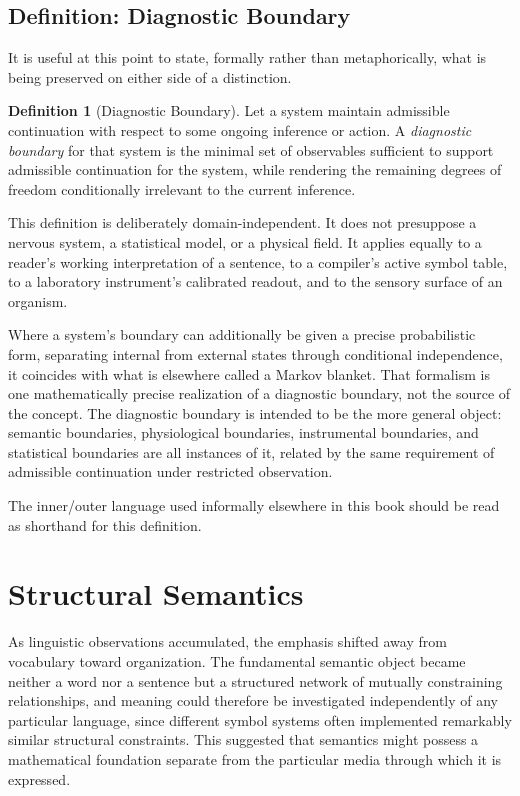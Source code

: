 \documentclass[11pt,oneside]{book}
\numberwithin{equation}{chapter}
\theoremstyle{definition}
\newtheorem{definition}{Definition}[chapter]
\theoremstyle{plain}
\begin{document}
\subsection*{Definition: Diagnostic Boundary}

It is useful at this point to state, formally rather than metaphorically,
what is being preserved on either side of a distinction.

\begin{definition}[Diagnostic Boundary]
Let a system maintain admissible continuation with respect to some ongoing
inference or action. A \emph{diagnostic boundary} for that system is the
minimal set of observables sufficient to support admissible continuation for
the system, while rendering the remaining degrees of freedom conditionally
irrelevant to the current inference.
\end{definition}

This definition is deliberately domain-independent. It does not presuppose a
nervous system, a statistical model, or a physical field. It applies equally
to a reader's working interpretation of a sentence, to a compiler's active
symbol table, to a laboratory instrument's calibrated readout, and to the
sensory surface of an organism.

Where a system's boundary can additionally be given a precise probabilistic
form, separating internal from external states through conditional
independence, it coincides with what is elsewhere called a Markov blanket.
That formalism is one mathematically precise realization of a diagnostic
boundary, not the source of the concept. The diagnostic boundary is intended
to be the more general object: semantic boundaries, physiological
boundaries, instrumental boundaries, and statistical boundaries are all
instances of it, related by the same requirement of admissible continuation
under restricted observation.

The inner/outer language used informally elsewhere in this book should be
read as shorthand for this definition.

\section{Structural Semantics}

As linguistic observations accumulated, the emphasis shifted away from vocabulary toward organization. The fundamental semantic object became neither a word nor a sentence but a structured network of mutually constraining relationships, and meaning could therefore be investigated independently of any particular language, since different symbol systems often implemented remarkably similar structural constraints. This suggested that semantics might possess a mathematical foundation separate from the particular media through which it is expressed.
\end{document}
